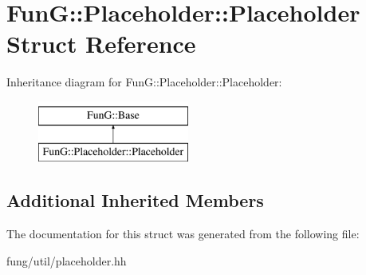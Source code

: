 \hypertarget{structFunG_1_1Placeholder_1_1Placeholder}{\section{Fun\-G\-:\-:Placeholder\-:\-:Placeholder Struct Reference}
\label{structFunG_1_1Placeholder_1_1Placeholder}
}
Inheritance diagram for Fun\-G\-:\-:Placeholder\-:\-:Placeholder\-:\begin{figure}[H]
\begin{center}
\leavevmode
\includegraphics[height=2.000000cm]{structFunG_1_1Placeholder_1_1Placeholder}
\end{center}
\end{figure}
\subsection*{Additional Inherited Members}


The documentation for this struct was generated from the following file\-:\begin{DoxyCompactItemize}
\item 
fung/util/placeholder.\-hh\end{DoxyCompactItemize}
